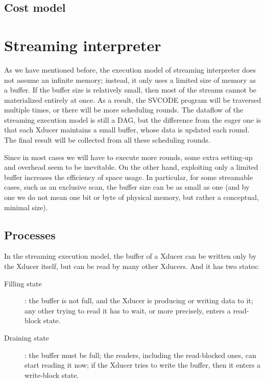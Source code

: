 \subsection{Cost model}



\section{Streaming interpreter}
As we have mentioned before, the execution model of streaming interpreter does not assume an infinite memory; instead, it only uses a limited size of memory as a buffer. 
If the buffer size is relatively small, then most of the streams cannot be materialized entirely at once. 
As a result, the SVCODE program will be traversed multiple times, or there will be more scheduling rounds. 
The dataflow of the streaming execution model is still a DAG, but the difference from the eager one is that each Xducer maintains a small buffer, whose data is updated each round. 
The final result will be collected from all these scheduling rounds.

Since in most cases we will have to execute more rounds, some extra setting-up and overhead seem to be inevitable.
On the other hand, exploiting only a limited buffer increases the efficiency of space usage. 
In particular, for some streamable cases, such as an exclusive scan, the buffer size can be as small as one (and by one we do not mean one bit or byte of physical memory, but rather a conceptual, minimal size).


\subsection{Processes}
In the streaming execution model, the buffer of a Xducer can be written only by the Xducer itself, but can be read by many other Xducers. 
And it has two states: 
\begin{description}
	\item[Filling state]: the buffer is not full, and the Xducer is producing or writing data to it; any other trying to read it has to wait, or more precisely, enters a read-block state.

	\item[Draining state]: the buffer must be full; the readers, including the read-blocked ones, can start reading it now; if the Xducer tries to write the buffer, then it enters a write-block state.
\end{description}

